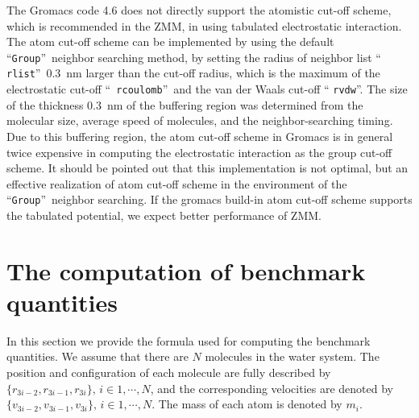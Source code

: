 \documentclass[a4paper,preprint,unsortedaddress,onecolumn,fleqn]{revtex4}
\begin{document}
The Gromacs code 4.6 does not directly support the atomistic cut-off scheme, 
{which is recommended in the ZMM, in }using tabulated
electrostatic interaction. The atom cut-off scheme can be implemented by
using the default \textquotedblleft \texttt{Group}\textquotedblright\
neighbor searching method, {%
{by }}setting the radius of neighbor list \textquotedblleft 
\texttt{rlist}\textquotedblright\ 0.3~nm larger than the cut-off radius,
which is the maximum of the electrostatic cut-off \textquotedblleft \texttt{%
rcoulomb}\textquotedblright\ and the van der Waals cut-off \textquotedblleft 
\texttt{rvdw}\textquotedblright . {The size of the thickness
0.3~nm of the buffering region was determined from the molecular size,
average speed of molecules, and the neighbor-searching timing. Due to this buffering region}, the atom cut-off scheme in
Gromacs is in general { twice} expensive { in
computing the electrostatic interaction} as the group cut-off scheme. {%
 It should be pointed out that this implementation is not
optimal, {but an effective realization of atom cut-off scheme in
the environment of the \textquotedblleft \texttt{Group}\textquotedblright\
neighbor searching. If} the gromacs build-in atom cut-off scheme supports
the tabulated potential, we expect better performance of ZMM. %
}

\section{The computation of benchmark quantities}

\label{appendix:benchmark}

In this section we provide the formula used for computing the benchmark
quantities. We assume that there are $N$ molecules in the water system. The
position and configuration of each molecule are fully described by $\{%
\mathbf{\mathit{r}}_{3i-2},\mathbf{\mathit{r}}_{3i-1},\mathbf{\mathit{r}}%
_{3i}\},\,i\in 1,\cdots ,N$, and the corresponding velocities are denoted by 
$\{\mathbf{\mathit{v}}_{3i-2},\mathbf{\mathit{v}}_{3i-1},\mathbf{\mathit{v}}%
_{3i}\},\,i\in 1,\cdots ,N$. The mass of each atom is denoted by $m_{i}$. 
\end{document}
